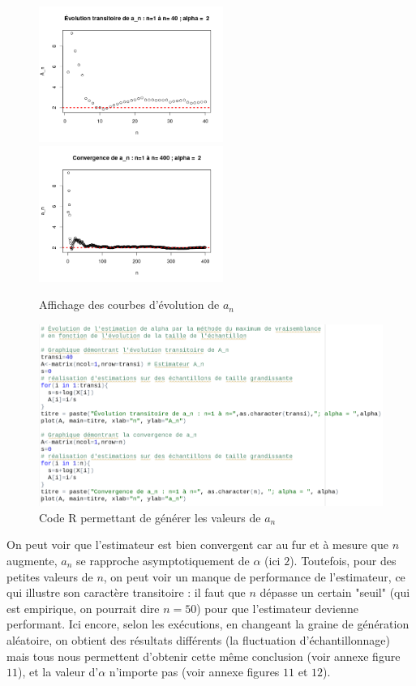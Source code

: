 \documentclass{article}
\begin{document}
\begin{figure}[!h]
\begin{center}
\includegraphics[width=6cm]{plot_graphique_transi}
\includegraphics[width=6cm]{plot_graphique_conv}
\caption{Affichage des courbes d'évolution de $a_n$}
\vspace{\floatsep}
\vspace{\floatsep}
\includegraphics[width=12cm]{code_graphique}
\caption{Code R permettant de générer les valeurs de $a_n$}
\end{center}
\end{figure}

On peut voir que l'estimateur est bien convergent car au fur et à mesure que $n$ augmente, $a_n$ se rapproche asymptotiquement de $\alpha$ (ici $2$). Toutefois, pour des petites valeurs de $n$, on peut voir un manque de performance de l'estimateur, ce qui illustre son caractère transitoire : il faut que $n$ dépasse un certain "seuil" (qui est empirique, on pourrait dire $n=50$) pour que l'estimateur devienne performant. Ici encore, selon les exécutions, en changeant la graine de génération aléatoire, on obtient des résultats différents (la fluctuation d'échantillonnage) mais tous nous permettent d'obtenir cette même conclusion (voir annexe figure $11$), et la valeur d'$\alpha$ n'importe pas (voir annexe figures $11$ et $12$).
\end{document}
